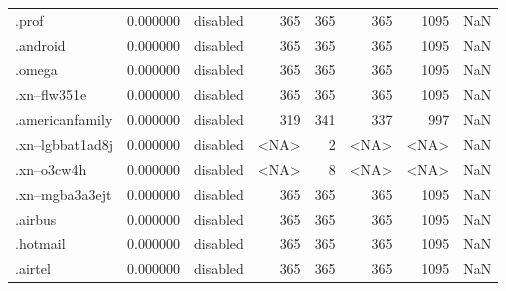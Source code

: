 \begin{tabular}{lrlrrrrl}
.prof                     &          0.000000 &        disabled &                         365 &                         365 &                         365 &                1095 &                  NaN \\
.android                  &          0.000000 &        disabled &                         365 &                         365 &                         365 &                1095 &                  NaN \\
.omega                    &          0.000000 &        disabled &                         365 &                         365 &                         365 &                1095 &                  NaN \\
.xn--flw351e              &          0.000000 &        disabled &                         365 &                         365 &                         365 &                1095 &                  NaN \\
.americanfamily           &          0.000000 &        disabled &                         319 &                         341 &                         337 &                 997 &                  NaN \\
.xn--lgbbat1ad8j          &          0.000000 &        disabled &                        <NA> &                           2 &                        <NA> &                <NA> &                  NaN \\
.xn--o3cw4h               &          0.000000 &        disabled &                        <NA> &                           8 &                        <NA> &                <NA> &                  NaN \\
.xn--mgba3a3ejt           &          0.000000 &        disabled &                         365 &                         365 &                         365 &                1095 &                  NaN \\
.airbus                   &          0.000000 &        disabled &                         365 &                         365 &                         365 &                1095 &                  NaN \\
.hotmail                  &          0.000000 &        disabled &                         365 &                         365 &                         365 &                1095 &                  NaN \\
.airtel                   &          0.000000 &        disabled &                         365 &                         365 &                         365 &                1095 &                  NaN \\

\end{tabular}
